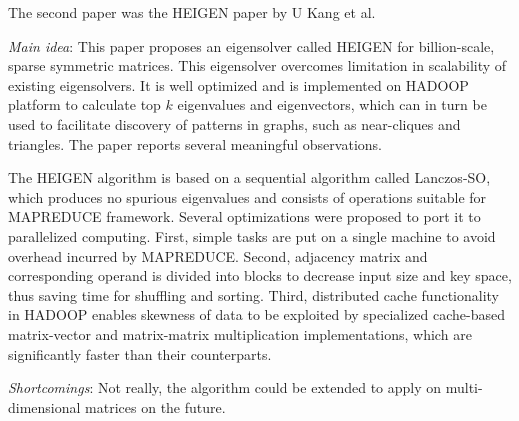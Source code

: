 The second paper was the HEIGEN paper by U Kang et al.
\cite{DBLP:conf/pakdd/KangMF11}
\begin{itemize*}
\item {\em Main idea}: 
This paper proposes an eigensolver called HEIGEN for billion-scale, sparse symmetric matrices. This eigensolver overcomes limitation in scalability of existing eigensolvers. It is well optimized and is implemented on HADOOP platform to calculate top $k$ eigenvalues and eigenvectors, which can in turn be used to facilitate discovery of patterns in graphs, such as near-cliques and triangles. The paper reports several meaningful observations.

The HEIGEN algorithm is based on a sequential algorithm called Lanczos-SO, which produces no spurious eigenvalues and consists of operations suitable for MAPREDUCE framework. Several optimizations were proposed to port it to parallelized computing. First, simple tasks are put on a single machine to avoid overhead incurred by MAPREDUCE. Second, adjacency matrix and corresponding operand is divided into blocks to decrease input size and key space, thus saving time for shuffling and sorting. Third, distributed cache functionality in HADOOP enables skewness of data to be exploited by specialized cache-based matrix-vector and matrix-matrix multiplication implementations, which are significantly faster than their counterparts.
\item {\em Shortcomings}:
Not really, the algorithm could be extended to apply on multi-dimensional matrices on the future.
\end{itemize*}

